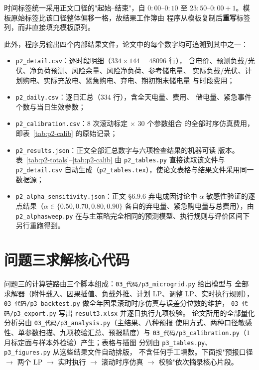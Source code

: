 \documentclass[withoutpreface,bwprint]{cumcmthesis}
\begin{document}
\begin{appendices}
时间标签统一采用正文口径的"起始--结束"，自 $0{:}00$--$0{:}10$ 至
$23{:}50$--$0{:}00{+}1$。模板原始标签比该口径整体偏移一格，故结果工作簿由
程序从模板复制后\textbf{重写}标签列，而非直接填充模板原列。

此外，程序另输出四个内部结果文件，论文中的每个数字均可追溯到其中之一：

\begin{itemize}
  \item \texttt{p2\_detail.csv}：逐时段明细（$334\times144=48096$ 行），
        含电价、预测负载/光伏、净负荷预测、风险余量、风险净负荷、参考储电量、
        实际负载/光伏、计划购电、实际充放电、紧急购电、弃电、期初期末储电量
        与时段费用；
  \item \texttt{p2\_daily.csv}：逐日汇总（$334$ 行），含全天电量、费用、
        储电量、紧急事件个数与当日生效参数；
  \item \texttt{p2\_calibration.csv}：$8$ 次滚动标定 $\times$ $30$ 个参数组合
        的全部时序仿真费用，即表~\ref{tab:p2-calib} 的原始记录；
  \item \texttt{p2\_results.json}：正文全部汇总数字与六项检查结果的机器可读
        版本。表~\ref{tab:p2-totals}--\ref{tab:p2-calib} 由
        \texttt{p2\_tables.py} 直接读取该文件与 \texttt{p2\_detail.csv}
        自动生成（\texttt{p2\_tables.tex}），使论文表格与结果文件采用同一数据源；
  \item \texttt{p2\_alpha\_sensitivity.json}：正文 §6.9.6 弃电成因讨论中
        $\alpha$ 敏感性验证的逐点结果（$\alpha\in\{0.50,0.70,0.80,0.90\}$
        各自的弃电量、紧急购电量与总费用），由 \texttt{p2\_alphasweep.py}
        在与主策略完全相同的预测模型、执行规则与评价区间下另行重跑得到。
\end{itemize}

\newpage
\section{问题三求解核心代码}

问题三的计算链路由三个脚本组成：\texttt{03\_代码/p3\_microgrid.py} 给出模型与
全部求解器（附件载入、因果插值、负载外推、计划 LP、调整 LP、实时执行规则），
\texttt{03\_代码/p3\_backtest.py} 做全年因果滚动时序仿真与误差分位数的维护，
\texttt{03\_代码/p3\_export.py} 写出 \texttt{result3.xlsx} 并逐日执行九项校验。
论文所用的全部量化分析另由 \texttt{03\_代码/p3\_analysis.py}（主结果、八种预报
使用方式、两种口径敏感性、单参数扫描、九项校验汇总、预报精度）与
\texttt{03\_代码/p3\_calibration.py}（$1$ 月标定面与样本外检验）产生；表格与插图
分别由 \texttt{p3\_tables.py}、\texttt{p3\_figures.py} 从这些结果文件自动排版，
不含任何手工填数。下面按"预报口径 $\to$ 两个 LP $\to$ 实时执行 $\to$ 滚动时序仿真
$\to$ 校验"依次摘录核心片段。


\end{appendices}
\end{document}
